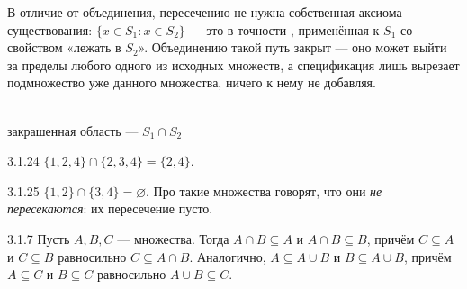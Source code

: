 \begin{intuition}
В отличие от объединения, пересечению не нужна собственная аксиома существования: $\{x \in
S_1 : x \in S_2\}$ — это в точности , применённая
к $S_1$ со свойством «лежать в $S_2$». Объединению такой путь закрыт — оно может выйти за
пределы любого одного из исходных множеств, а спецификация лишь вырезает подмножество уже
данного множества, ничего к нему не добавляя.

\begin{center}
\\
{\footnotesize\color{intuitiongray}закрашенная область — $S_1\cap S_2$}
\end{center}
\end{intuition}

\begin{example}{3.1.24}{}
$\{1,2,4\} \cap \{2,3,4\} = \{2,4\}$.
\end{example}

\begin{example}{3.1.25}{}
$\{1,2\} \cap \{3,4\} = \varnothing$. Про такие множества говорят, что они
\emph{не пересекаются}: их пересечение пусто.
\end{example}

\begin{exercise}{3.1.7}{}
Пусть $A,B,C$ — множества. Тогда $A \cap B \subseteq A$ и $A \cap B \subseteq B$, причём
$C \subseteq A$ и $C \subseteq B$ равносильно $C \subseteq A \cap B$. Аналогично,
$A \subseteq A \cup B$ и $B \subseteq A \cup B$, причём $A \subseteq C$ и $B \subseteq C$
равносильно $A \cup B \subseteq C$.
\end{exercise}

